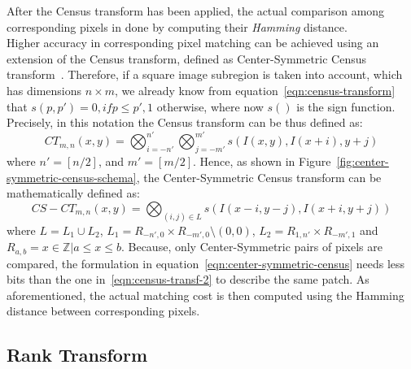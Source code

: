 After the Census transform has been applied, the actual comparison among corresponding pixels in done by computing their \textit{Hamming} distance.\\ 
Higher accuracy in corresponding pixel matching can be achieved using an extension of the Census transform, defined as Center-Symmetric Census transform~\cite{Spangenberg2013}.
Therefore, if a square image subregion is taken into account, which has dimensions $n \times m$, we already know from equation~\ref{eqn:census-transform} that $s(p, p') = 0, if p \leq p', 1$ otherwise, where now $s( )$ is the sign function.
Precisely, in this notation the Census transform can be thus defined as:
\begin{equation}
	\label{eqn:census-transf-2}
	CT_{m,n}(x, y) = \bigotimes_{i = -n'}^{n'} \bigotimes_{j = -m'}^{m'} s(I(x, y), I(x + i), y + j)
\end{equation}
where $n' = [n/2]$, and $m' = [m/2]$.
Hence, as shown in Figure~\ref{fig:center-symmetric-census-schema}, the Center-Symmetric Census transform can be mathematically defined as:
\begin{equation}
	\label{eqn:center-symmetric-census}
	CS-CT_{m,n}(x, y) = \bigotimes_{(i, j) \in L} s(I(x - i, y - j), I(x + i, y + j))
\end{equation}
where $L = L_1 \cup L_2$, $L_1 = R_{-n',0} \times R_{-m',0} \setminus {(0, 0)}$, $L_2 = R_{1,n'} \times R_{-m',1}$ and $R_{a, b} = {x \in \mathbb{Z} \vert a \leq x \leq b}$.
Because, only Center-Symmetric pairs of pixels are compared, the formulation in equation~\ref{eqn:center-symmetric-census} needs less bits than the one in~\ref{eqn:census-transf-2} to describe the same patch. 
As aforementioned, the actual matching cost is then computed using the Hamming distance between corresponding pixels. 

\subsection{Rank Transform}
\label{subsection:rank-transform}

